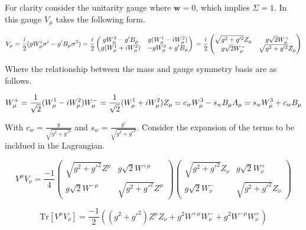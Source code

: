 For clarity consider the unitarity gauge where $\textbf{w} = 0$, which implies $\Sigma = 1$.  In this gauge $V_{\mu}$ takes the following form.

\begin{equation*}
V_{\mu} = \frac{i}{2}(gW_{\mu}^{i}\sigma^{i} - g'B_{\mu}\sigma^{3}) = \frac{i}{2}
  \begin{pmatrix}
    gW_{\mu}^{3} - g'B_{\mu} & g(W_{\mu}^{1} - iW_{\mu}^{2}) \\
    g(W_{\mu}^{1} + iW_{\mu}^{2}) & -gW_{\mu}^{3} + g'B_{\mu}
  \end{pmatrix} \\
= \frac{i}{2}
  \begin{pmatrix}
    \sqrt{g^{2} + g'^{2}} Z_{\mu} & g\sqrt{2}W^{+}_{\mu} \\
    g\sqrt{2}W^{-}_{\mu} & \sqrt{g^{2} + g'^{2}} Z_{\mu}
  \end{pmatrix}
\end{equation*}

Where the relationship between the mass and gauge symmetry basis are as follows.

\begin{equation}
  W^{+}_{\mu} = \frac{1}{\sqrt{2}}(W^{1}_{\mu} - i W^{2}_{\mu}) \\
  W^{-}_{\mu} = \frac{1}{\sqrt{2}}(W^{1}_{\mu} + i W^{2}_{\mu}) \\
  Z_{\mu} = c_{w}W^{3}_{\mu} - s_{w}B_{\mu} \\
  A_{\mu} = s_{w}W^{3}_{\mu} + c_{w}B_{\mu}
\end{equation}

With $c_{w} = \frac{g}{\sqrt{g^{2} + g'^{2}}}$ and $s_{w} = \frac{g'}{\sqrt{g^{2} + g'^{2}}}$.  Consider the expansion of the terms to be incldued in the Lagrangian.

\begin{equation}
V^{\mu}V_{\nu} = \frac{-1}{4}
  \begin{pmatrix}
    \sqrt{g^{2} + g'^{2}} Z^{\mu} & g\sqrt{2}W^{+\mu} \\
    g\sqrt{2}W^{-\mu} & \sqrt{g^{2} + g'^{2}} Z^{\mu}
  \end{pmatrix}
  \begin{pmatrix}
    \sqrt{g^{2} + g'^{2}} Z_{\nu} & g\sqrt{2}W^{+}_{\nu} \\
    g\sqrt{2}W^{-}_{\nu} & \sqrt{g^{2} + g'^{2}} Z_{\nu}
  \end{pmatrix}
\end{equation}

\begin{equation}
  \text{Tr}[V^{\mu}V_{\nu}] = \frac{-1}{2} ((g^{2} + g'^{2})Z^{\mu}Z_{\nu} + g^{2}W^{+\mu}W^{-}_{\nu} + g^{2}W^{-\mu}W^{+}_{\nu}) 
\end{equation}

